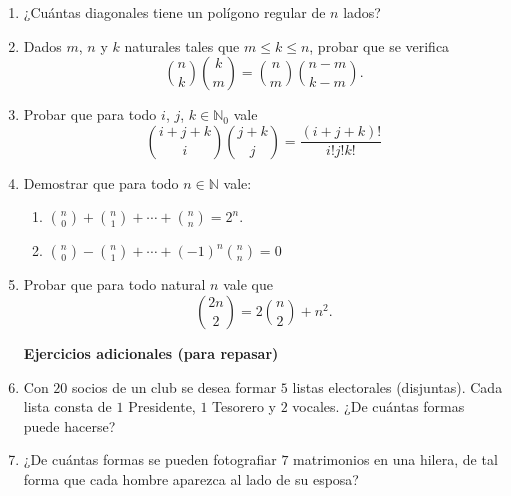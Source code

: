 \documentclass[12pt,spanish,makeidx]{amsbook}
\begin{document}
\begin {enumerate}
\smallskip

\item ¿Cuántas diagonales tiene un polígono regular de $n$ lados?

\smallskip

\item Dados $m$, $n$ y $k$ naturales tales que $m \le k \le n$, probar que se verifica
\begin{equation*}
	\binom{n}{k}\binom{k}{m} = \binom{n}{m}\binom{n-m}{k-m}.
\end{equation*}


\smallskip

\item Probar que para todo $i$, $j$, $k \in {\mathbb N}_0$ vale
\begin{equation*}
	\binom{i + j + k}{i}\binom{j+k}{j} = \frac{(i+j+k)!}{i!j!k!}
\end{equation*}

\smallskip

\item Demostrar que para todo $n \in \mathbb N$ vale:
\begin{enumerate}
  \item $\displaystyle{\binom{n}{0} + \binom{n}{1} + \cdots + \binom{n}{n} = 2^n}$.
\medskip
  \item $\displaystyle{\binom{n}{0} - \binom{n}{1} + \cdots + (-1)^n\binom{n}{n} = 0}$
  \end{enumerate}

\smallskip

\item Probar que para todo natural $n$ vale que 
\begin{equation*}
	\binom{2n}{2} = 2 \binom{n}{2} + n^2.
\end{equation*}



\medskip



\begin{center}
	\textbf{Ejercicios adicionales (para repasar)}
\end{center}

\medskip

\item Con $20$ socios de un club se desea formar $5$ listas electorales (disjuntas).
Cada lista consta de $1$ Presidente, $1$ Tesorero y $2$ vocales.  ¿De cuántas
formas puede hacerse?

\smallskip

\item ¿De cuántas formas se pueden fotografiar $7$ matrimonios en una hilera,
de tal forma que cada hombre aparezca al lado de su esposa?


\end{enumerate}
\end{document}
